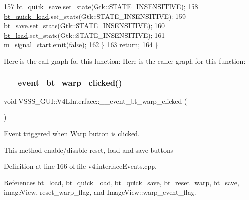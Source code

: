 \begin{DoxyCode}
157             \hyperlink{class_v_s_s_s___g_u_i_1_1_v4_l_interface_a424118f056f71fba97d881f4647f7555}{bt\_quick\_save}.set\_state(Gtk::STATE\_INSENSITIVE);
158             \hyperlink{class_v_s_s_s___g_u_i_1_1_v4_l_interface_a7b72e731fab1a75270726fcd3936521e}{bt\_quick\_load}.set\_state(Gtk::STATE\_INSENSITIVE);
159             \hyperlink{class_v_s_s_s___g_u_i_1_1_v4_l_interface_a961db9f4decd0e940ebd69fbb0cccc61}{bt\_save}.set\_state(Gtk::STATE\_INSENSITIVE);
160             \hyperlink{class_v_s_s_s___g_u_i_1_1_v4_l_interface_a4c726d738e66bc77323a038918d133ce}{bt\_load}.set\_state(Gtk::STATE\_INSENSITIVE);
161             \hyperlink{class_v_s_s_s___g_u_i_1_1_v4_l_interface_a106a19f83b60b118984f3aece410d140}{m\_signal\_start}.emit(\textcolor{keyword}{false});
162         \}
163         \textcolor{keywordflow}{return};
164     \}
\end{DoxyCode}
Here is the call graph for this function\+:
Here is the caller graph for this function\+:
\mbox{\label{class_v_s_s_s___g_u_i_1_1_v4_l_interface_add951ff9c99d2d8027a27f86412007ab}} 
\subsubsection{\texorpdfstring{\+\_\+\+\_\+event\+\_\+bt\+\_\+warp\+\_\+clicked()}{\_\_event\_bt\_warp\_clicked()}}
{\footnotesize\ttfamily void V\+S\+S\+S\+\_\+\+G\+U\+I\+::\+V4\+L\+Interface\+::\+\_\+\+\_\+event\+\_\+bt\+\_\+warp\+\_\+clicked (\begin{DoxyParamCaption}{ }\end{DoxyParamCaption})}



Event triggered when \textquotesingle{}Warp\textquotesingle{} button is clicked. 

This method enable/disable reset, load and save buttons 

Definition at line 166 of file v4linterface\+Events.\+cpp.



References bt\+\_\+load, bt\+\_\+quick\+\_\+load, bt\+\_\+quick\+\_\+save, bt\+\_\+reset\+\_\+warp, bt\+\_\+save, image\+View, reset\+\_\+warp\+\_\+flag, and Image\+View\+::warp\+\_\+event\+\_\+flag.



